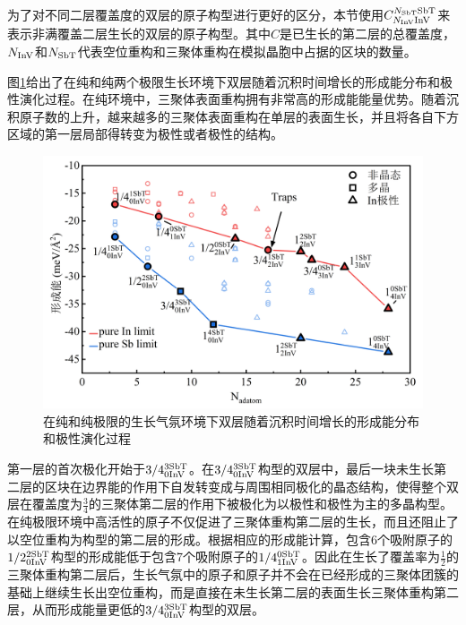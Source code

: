 为了对不同二层覆盖度的双层的原子构型进行更好的区分，本节使用$C_{N_{\rm InV}\rm InV}^{N_{\rm SbT}\rm SbT}$来表示非满覆盖二层生长的双层的原子构型。其中$C$是已生长的第二层的总覆盖度，$N_{\rm InV}$和$N_{\rm SbT}$代表空位重构和三聚体重构在模拟晶胞中占据的区块的数量。

图\ref{fig:IS_DFT_2LInSb_partEnergy}给出了在纯和纯两个极限生长环境下双层随着沉积时间增长的形成能分布和极性演化过程。在纯环境中，三聚体表面重构拥有非常高的形成能能量优势。随着沉积原子数的上升，越来越多的三聚体表面重构在单层的表面生长，并且将各自下方区域的第一层局部得转变为极性或者极性的结构。


\begin{figure}[htb]
    \includegraphics{pic/IS_DFT_2LInSb_partEnergy.png}
    \caption{在纯和纯极限的生长气氛环境下双层随着沉积时间增长的形成能分布和极性演化过程}
    \label{fig:IS_DFT_2LInSb_partEnergy}
\end{figure}

第一层的首次极化开始于$\rm 3/4{}_{0InV}^{3SbT} \it$。在$\rm 3/4{}_{0InV}^{3SbT} \it$构型的双层中，最后一块未生长第二层的区块在边界能的作用下自发转变成与周围相同极化的晶态结构，使得整个双层在覆盖度为$\frac{3}{4}$的三聚体第二层的作用下被极化为以极性和极性为主的多晶构型。在纯极限环境中高活性的原子不仅促进了三聚体重构第二层的生长，而且还阻止了以空位重构为构型的第二层的形成。根据相应的形成能计算，包含6个吸附原子的$\rm 1/2{}_{0InV}^{2SbT} \it$构型的形成能低于包含7个吸附原子的$\rm 1/4{}_{1InV}^{0SbT} \it$。因此在生长了覆盖率为$\frac{1}{2}$的三聚体重构第二层后，生长气氛中的原子和原子并不会在已经形成的三聚体团簇的基础上继续生长出空位重构，而是直接在未生长第二层的表面生长三聚体重构第二层，从而形成能量更低的$\rm 3/4{}_{0InV}^{3SbT} \it$构型的双层。

